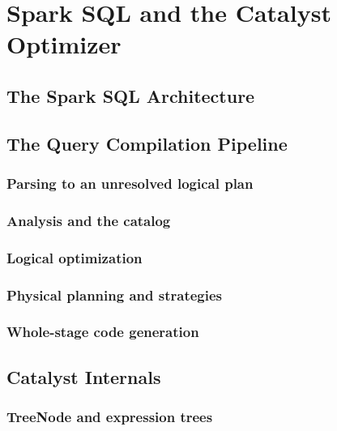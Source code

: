 \chapter{Spark SQL and the Catalyst Optimizer}
\label{ch:catalyst}

\tbd


\section{The Spark SQL Architecture}
\label{sec:cat-arch}
\tbd

\section{The Query Compilation Pipeline}
\label{sec:cat-pipeline}

\subsection{Parsing to an unresolved logical plan}
\tbd

\subsection{Analysis and the catalog}
\tbd

\subsection{Logical optimization}
\tbd

\subsection{Physical planning and strategies}
\tbd

\subsection{Whole-stage code generation}
\tbd

\section{Catalyst Internals}
\label{sec:cat-internals}

\subsection{TreeNode and expression trees}
\tbd

